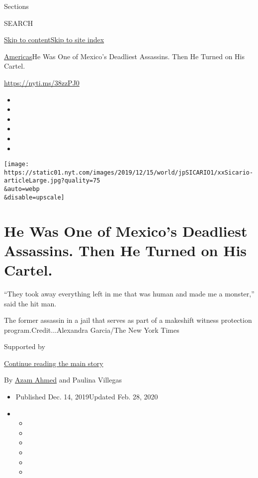 Sections

SEARCH

\protect\hyperlink{site-content}{Skip to
content}\protect\hyperlink{site-index}{Skip to site index}

\href{/section/world/americas}{Americas}\textbar{}He Was One of Mexico's
Deadliest Assassins. Then He Turned on His Cartel.

\url{https://nyti.ms/38zzPJ0}

\begin{itemize}
\item
\item
\item
\item
\item
\item
\end{itemize}

\texttt{[image: https://static01.nyt.com/images/2019/12/15/world/jpSICARIO1/xxSicario-articleLarge.jpg?quality=75\\\&auto=webp\\\&disable=upscale]}

\hypertarget{he-was-one-of-mexicos-deadliest-assassins-then-he-turned-on-his-cartel}{%
\section{He Was One of Mexico's Deadliest Assassins. Then He Turned on
His
Cartel.}\label{he-was-one-of-mexicos-deadliest-assassins-then-he-turned-on-his-cartel}}

``They took away everything left in me that was human and made me a
monster,'' said the hit man.

The former assassin in a jail that serves as part of a makeshift witness
protection program.Credit...Alexandra Garcia/The New York Times

Supported by

\protect\hyperlink{after-sponsor}{Continue reading the main story}

By \href{https://www.nytimes.com/by/azam-ahmed}{Azam Ahmed} and Paulina
Villegas

\begin{itemize}
\item
  Published Dec. 14, 2019Updated Feb. 28, 2020
\item
  \begin{itemize}
  \item
  \item
  \item
  \item
  \item
  \item
  \end{itemize}
\end{itemize}

